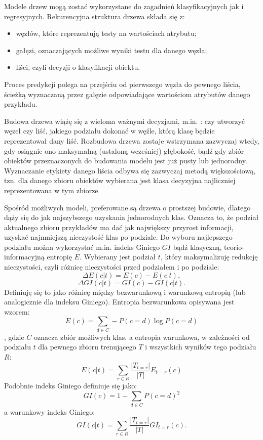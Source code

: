 Modele drzew mogą zostać wykorzystane do zagadnień klasyfikacyjnych jak i regresyjnych.
Rekurencyjna struktura drzewa składa się z:
\begin{itemize}
    \item węzłów, które reprezentują testy na wartościach atrybutu;
    \item gałęzi, oznaczających możliwe wyniki testu dla danego węzła;
    \item liści, czyli decyzji o klasyfikacji obiektu.
\end{itemize}
Proces predykcji polega na przejściu od pierwszego węzła do pewnego liścia, ścieżką wyznaczaną przez gałęzie odpowiadające wartościom atrybutów danego przykładu.

Budowa drzewa wiążę się z wieloma ważnymi decyzjami, m.in. : czy utworzyć węzeł czy liść,  jakiego podziału dokonać w węźle, którą klasę będzie reprezentował dany liść. Rozbudowa drzewa zostaje wstrzymana zazwyczaj wtedy, gdy osiągnie ono maksymalną (ustaloną wcześniej) głębokość, bądź gdy zbiór obiektów przeznaczonych do budowania modelu jest już pusty lub jednorodny. Wyznaczanie etykiety danego liścia odbywa się zazwyczaj metodą większościową, tzn.  dla danego zbioru obiektów wybierana jest klasa
decyzyjna najliczniej reprezentowana w tym zbiorze

Spośród możliwych modeli, preferowane są drzewa o prostszej budowie, dlatego dąży się do jak najszybszego uzyskania jednorodnych klas. Oznacza to, że podział aktualnego zbioru przykładów ma dać jak największy przyrost informacji, uzyskać najmniejszą nieczystość
klas po podziale. Do wyboru najlepszego podziału można wykorzystać m.in. indeks Giniego $GI$ bądź klasyczną, teorio-informacyjną entropię $E$. Wybierany jest podział $t$, który maksymalizuję redukcję nieczystości, czyli
różnicę nieczystości przed podziałem i po podziale:
\begin{equation}
    \Delta E(c|t) = E(c)-E(c|t),
\end{equation}
\begin{equation}
 \Delta GI(c|t) = GI(c)-GI(c|t).      
 \end{equation}
Definiuję się to jako różnicę między bezwarunkową i warunkową entropią (lub
analogicznie dla indeksu Giniego).
Entropia bezwarunkowa opisywana jest wzorem:
\begin{equation}
    E(c) = \sum_{d\in C} - P(c=d)\log P(c=d)
\end{equation},
gdzie $C$ oznacza zbiór możliwych klas.
a entropia warunkowa, w zależności od podziału $t$ dla pewnego zbioru trenującego $T$ i wszystkich wyników tego podziału $R$:
\begin{equation}
    E(c|t) = \sum_{r\in R} \frac{|T_{t=r}|}{|T|}E_{t=r}(c)
\end{equation}
Podobnie indeks Giniego definiuje się jako:
\begin{equation}
    GI(c) = 1- \sum_{d\in C}P(c=d)^2
\end{equation}
a warunkowy indeks Giniego:
\begin{equation}
      GI(c|t) = \sum_{r\in R} \frac{|T_{t=r}|}{|T|}GI_{t=r}(c).
\end{equation}

